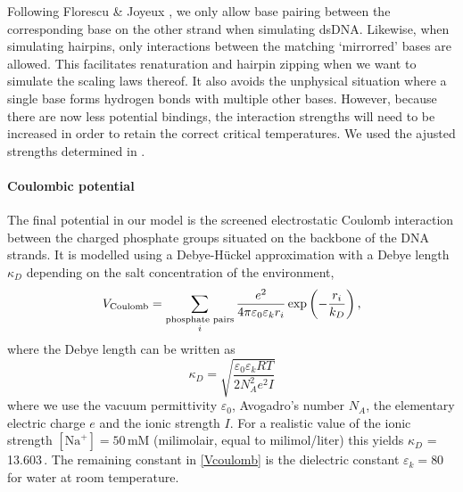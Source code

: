 Following Florescu \& Joyeux \cite{florescu2011thermal}, we only allow base pairing between the corresponding base on the other strand when simulating dsDNA. Likewise, when simulating hairpins, only interactions between the matching `mirrorred' bases are allowed. This facilitates renaturation and hairpin zipping when we want to simulate the scaling laws thereof. It also avoids the unphysical situation where a single base forms hydrogen bonds with multiple other bases. However, because there are now less potential bindings, the interaction strengths will need to be increased in order to retain the correct critical temperatures. We used the ajusted strengths determined in \cite{florescu2011thermal}.


\paragraph{Coulombic potential}
The final potential in our model is the screened electrostatic Coulomb interaction between the charged phosphate groups situated on the backbone of the DNA strands. It is modelled using a Debye-H\"uckel approximation with a Debye length $\kappa_D$ depending on the salt concentration of the environment,
\begin{equation}
V_\text{Coulomb}
= \sum_{\substack{\text{phosphate pairs}\\i}}
	\frac{e^2}{4 \pi \varepsilon_0 \varepsilon_k r_i}
       		\exp \left(- \frac{r_i}{k_D} \right),
\label{Vcoulomb}
\end{equation}
where the Debye length can be written as
\begin{equation}
\kappa_D
= \sqrt{ \frac{\varepsilon_0 \varepsilon_k RT}{2N^2_A e^2 I}}
\end{equation}
where we use the vacuum permittivity $\varepsilon_0$, Avogadro's number $N_A$, the elementary electric charge $e$ and the ionic strength $I$. For a realistic value of the ionic strength $[\text{Na}^+] = 50$\,mM (milimolair, equal to milimol/liter) this yields $\kappa_D$ = 13.603\,\Angstrom. The remaining constant in \eqref{Vcoulomb} is the dielectric constant $\varepsilon_k = 80$ for water at room temperature.


